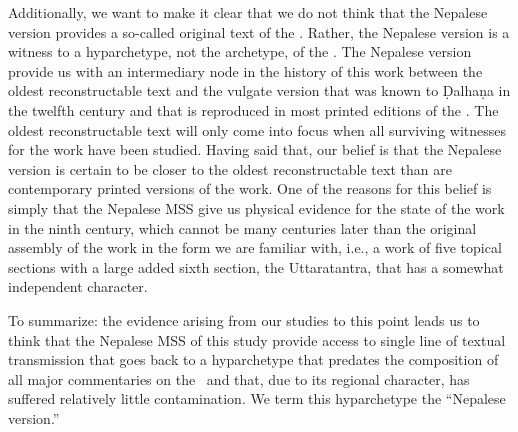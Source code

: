 Additionally, we want to make it clear that we do not think that the Nepalese
version provides a so-called original text of the \SS.   Rather, the Nepalese
version is a witness to a hyparchetype, not the archetype, of the \SS.   The
Nepalese version provide us with an intermediary node in the history of this work
between the oldest reconstructable text and the vulgate version that was known to
Ḍalhaṇa in the twelfth century and that is reproduced in most printed editions of
the \SS.  The oldest reconstructable text will only come into focus when all
surviving witnesses for the work have been studied.  Having said that, our belief is
that the Nepalese version is certain to be closer to the oldest reconstructable
text than are contemporary printed versions of the work.  One of the reasons for
this belief is simply that the Nepalese MSS give us physical evidence for the
state of the work in the ninth century, which cannot be many centuries later than
the original assembly of the work in the form we are familiar with, i.e., a work
of five topical sections with a large added sixth section, the Uttaratantra, that
has a somewhat independent character. 

%
%

To summarize: the evidence arising from our studies to this point leads us to
think that the Nepalese MSS of this study provide access to single line of textual
transmission that goes back to a hyparchetype that predates the composition of all
major commentaries on the \SS\ and that, due to its regional character, has
suffered relatively little contamination. We term this hyparchetype the “Nepalese
version.” 



